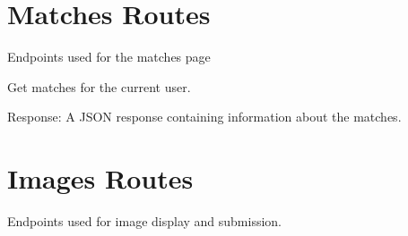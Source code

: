 \documentclass[letterpaper,10pt,english]{sphinxmanual}
\begin{document}
\sphinxstepscope


\chapter{Matches Routes}
\label{\detokenize{routes.matches:module-routes.matches.routes}}\label{\detokenize{routes.matches:matches-routes}}\label{\detokenize{routes.matches::doc}}
\sphinxAtStartPar
Endpoints used for the matches page

\begin{fulllineitems}
\label{\detokenize{routes.matches:routes.matches.routes.getmatches}}
\pysigstartsignatures
{}
\pysigstopsignatures
\sphinxAtStartPar
Get matches for the current user.
\begin{description}
\sphinxAtStartPar
Response: A JSON response containing information about the matches.

\end{description}

\end{fulllineitems}


\sphinxstepscope


\chapter{Images Routes}
\label{\detokenize{routes.images:module-routes.images.routes}}\label{\detokenize{routes.images:images-routes}}\label{\detokenize{routes.images::doc}}
\sphinxAtStartPar
Endpoints used for image display and submission.
\end{document}
